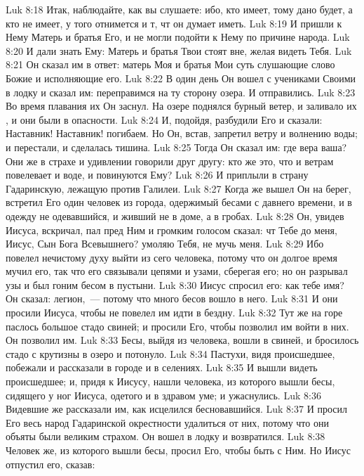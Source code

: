 \vs Luk 8:18 Итак, наблюдайте, как вы слушаете: ибо, кто имеет, тому дано будет, а кто не имеет, у того отнимется и т, чт он думает иметь.
\rsbpar\vs Luk 8:19 И пришли к Нему Матерь и братья Его, и не могли подойти к Нему по причине народа.
\vs Luk 8:20 И дали знать Ему: Матерь и братья Твои стоят вне, желая видеть Тебя.
\vs Luk 8:21 Он сказал им в ответ: матерь Моя и братья Мои суть слушающие слово Божие и исполняющие его.
\rsbpar\vs Luk 8:22 В один день Он вошел с учениками Своими в лодку и сказал им: переправимся на ту сторону озера. И отправились.
\vs Luk 8:23 Во время плавания их Он заснул. На озере поднялся бурный ветер, и заливало их , и они были в опасности.
\vs Luk 8:24 И, подойдя, разбудили Его и сказали: Наставник! Наставник! погибаем. Но Он, встав, запретил ветру и волнению воды; и перестали, и сделалась тишина.
\vs Luk 8:25 Тогда Он сказал им: где вера ваша? Они же в страхе и удивлении говорили друг другу: кто же это, что и ветрам повелевает и воде, и повинуются Ему?
\rsbpar\vs Luk 8:26 И приплыли в страну Гадаринскую, лежащую против Галилеи.
\vs Luk 8:27 Когда же вышел Он на берег, встретил Его один человек из города, одержимый бесами с давнего времени, и в одежду не одевавшийся, и живший не в доме, а в гробах.
\vs Luk 8:28 Он, увидев Иисуса, вскричал, пал пред Ним и громким голосом сказал: чт Тебе до меня, Иисус, Сын Бога Всевышнего? умоляю Тебя, не мучь меня.
\vs Luk 8:29 Ибо  повелел нечистому духу выйти из сего человека, потому что он долгое время мучил его, так что его связывали цепями и узами, сберегая его; но он разрывал узы и был гоним бесом в пустыни.
\vs Luk 8:30 Иисус спросил его: как тебе имя? Он сказал: легион,~--- потому что много бесов вошло в него.
\vs Luk 8:31 И они просили Иисуса, чтобы не повелел им идти в бездну.
\vs Luk 8:32 Тут же на горе паслось большое стадо свиней; и  просили Его, чтобы позволил им войти в них. Он позволил им.
\vs Luk 8:33 Бесы, выйдя из человека, вошли в свиней, и бросилось стадо с крутизны в озеро и потонуло.
\vs Luk 8:34 Пастухи, видя происшедшее, побежали и рассказали в городе и в селениях.
\vs Luk 8:35 И вышли видеть происшедшее; и, придя к Иисусу, нашли человека, из которого вышли бесы, сидящего у ног Иисуса, одетого и в здравом уме; и ужаснулись.
\vs Luk 8:36 Видевшие же рассказали им, как исцелился бесновавшийся.
\vs Luk 8:37 И просил Его весь народ Гадаринской окрестности удалиться от них, потому что они объяты были великим страхом. Он вошел в лодку и возвратился.
\vs Luk 8:38 Человек же, из которого вышли бесы, просил Его, чтобы быть с Ним. Но Иисус отпустил его, сказав:
